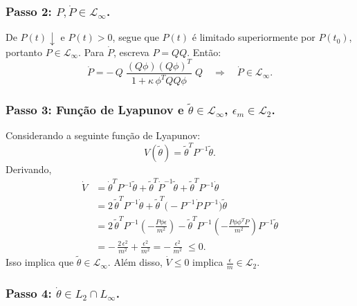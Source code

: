 \documentclass[10pt]{article}
\begin{document}
\subsubsection*{Passo 2: \(P,\dot P\in \mathcal{L}_\infty\).}

De \(P(t)\downarrow\) e \(P(t) > 0\), segue que \(P(t)\) é limitado superiormente por \(P(t_0)\),
portanto \(P\in \mathcal{L}_\infty\).
Para \(\dot P\), escreva \(P=QQ\).
Então:
\[
\dot P
= -\,Q\;\frac{(Q\phi)(Q\phi)^T}{1+\kappa\,\phi^T QQ\phi}\;Q \quad \Rightarrow \quad \dot P\in \mathcal{L}_\infty.
\]

\subsubsection*{Passo 3: Função de Lyapunov e \(\tilde\theta\in \mathcal{L}_\infty\), \(\epsilon_m\in \mathcal{L}_2\).}

Considerando a seguinte função de Lyapunov: 
\[
V(\tilde\theta)=\tilde\theta^T P^{-1}\tilde\theta.
\]
Derivando,
\begin{align*}
\dot V
&= \dot\theta^T P^{-1}\tilde\theta + \tilde\theta^T \dot P^{-1} \tilde\theta + \tilde\theta^T P^{-1} \dot\theta \\
&= 2\,\tilde\theta^T P^{-1}\dot{\theta}
   + \tilde\theta^T\Big(-P^{-1}\dot P\,P^{-1}\Big)\tilde\theta\\
&= 2\,\tilde\theta^T P^{-1}\!\left(-\frac{P\phi\epsilon}{m^2}\right)
   - \tilde\theta^T P^{-1} \!\left(-\frac{P \phi\phi^T P}{m^2}\right)\! P^{-1} \tilde\theta\\
&= -\,\frac{2\,\epsilon^2}{m^2} + \frac{\epsilon^2}{m^2}
= -\,\frac{\epsilon^2}{m^2} \;\le 0.
\end{align*}
Isso implica que \(\tilde\theta\in \mathcal{L}_\infty\).
Além disso, \(\dot V \le 0\) implica \(\frac{\epsilon}{m}\in \mathcal{L}_2\).

\subsubsection*{Passo 4: \(\dot\theta\in L_2\cap L_\infty\).}
\end{document}
